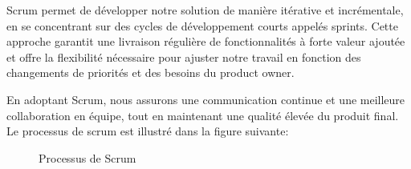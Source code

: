 Scrum permet de développer notre solution de manière itérative et incrémentale, en se concentrant sur des cycles de développement courts appelés sprints. Cette approche garantit une livraison régulière de fonctionnalités à forte valeur ajoutée et offre la flexibilité nécessaire pour ajuster notre travail en fonction des changements de priorités et des besoins du product owner.

En adoptant Scrum, nous assurons une communication continue et une meilleure collaboration en équipe, tout en maintenant une qualité élevée du produit final. \cite[]{Scrum}\\ 
Le processus de scrum est illustré dans la figure suivante:
\begin{figure}[H]    
    \centering
        \caption{Processus de Scrum}
        \label{fig:logo_tt}
    \end{figure}


